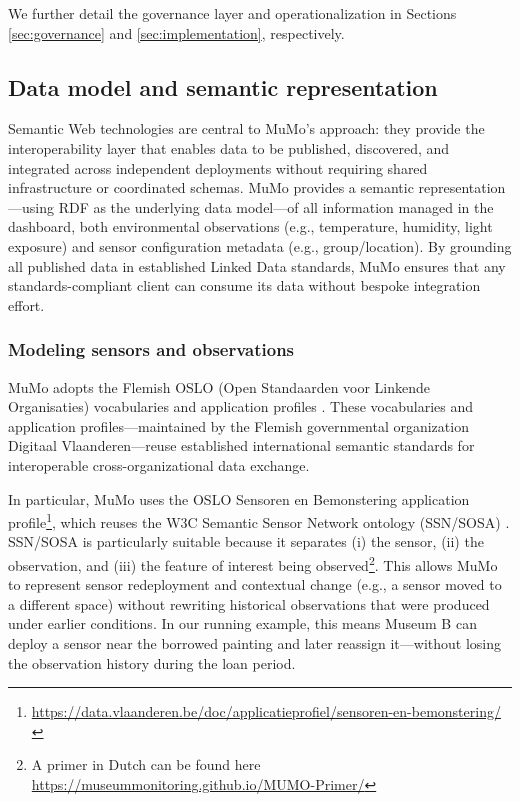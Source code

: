 We further detail the governance layer and operationalization in
Sections \ref{sec:governance} and \ref{sec:implementation},
respectively.

\subsection{Data model and semantic representation}\label{sec:datamodel}

Semantic Web technologies are central to MuMo's approach: they provide
the interoperability layer that enables data to be published,
discovered, and integrated across independent deployments without
requiring shared infrastructure or coordinated schemas. MuMo provides a
semantic representation---using RDF as the underlying data model---of
all information managed in the dashboard, both environmental
observations (e.g., temperature, humidity, light exposure) and sensor
configuration metadata (e.g., group/location). By grounding all
published data in established Linked Data standards, MuMo ensures that
any standards-compliant client can consume its data without bespoke
integration effort.

\subsubsection{Modeling sensors and
observations}\label{modeling-sensors-and-observations}

MuMo adopts the Flemish OSLO (Open Standaarden voor Linkende
Organisaties) vocabularies and application profiles
\cite{buyle2016oslo}. These vocabularies and application
profiles---maintained by the Flemish governmental organization Digitaal
Vlaanderen---reuse established international semantic standards for
interoperable cross-organizational data exchange.

In particular, MuMo uses the OSLO Sensoren en Bemonstering application
profile\footnote{\url{https://data.vlaanderen.be/doc/applicatieprofiel/sensoren-en-bemonstering/}},
which reuses the W3C Semantic Sensor Network ontology (SSN/SOSA)
\cite{compton2012ssn, ssn-sosa}. SSN/SOSA is particularly suitable
because it separates (i) the sensor, (ii) the observation, and (iii) the
feature of interest being
observed\footnote{A primer in Dutch can be found here \url{https://museummonitoring.github.io/MUMO-Primer/}}.
This allows MuMo to represent sensor redeployment and contextual change
(e.g., a sensor moved to a different space) without rewriting historical
observations that were produced under earlier conditions. In our running
example, this means Museum B can deploy a sensor near the borrowed
painting and later reassign it---without losing the observation history
during the loan period.

